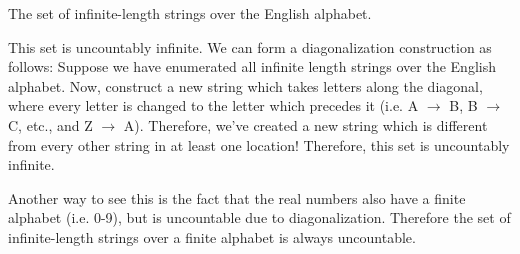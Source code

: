 \documentclass[11pt]{article}
\begin{document}
\begin{Parts}
\Part The set of infinite-length strings over the English alphabet.

\begin{solution}
  This set is uncountably infinite. We can form a diagonalization construction as follows: Suppose we have enumerated all infinite length strings over the English alphabet. Now, construct a new string which takes letters along the diagonal, where every letter is changed to the letter which precedes it (i.e. A $\to$ B, B $\to$ C, etc., and Z $\to$ A). Therefore, we've created a new string which is different from every other string in at least one location! Therefore, this set is uncountably infinite. 

  Another way to see this is the fact that the real numbers also have a finite alphabet (i.e. 0-9), but is uncountable due to diagonalization. Therefore the set of infinite-length strings over a finite alphabet is always uncountable. 
\end{solution}

\end{Parts}

\pagebreak
{}
\end{document}
